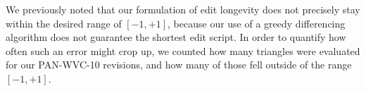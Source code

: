 We previously noted that our formulation of edit longevity does
not precisely stay within the desired range of $[-1,+1]$,
because our use of a greedy differencing algorithm does not
guarantee the shortest edit script.
In order to quantify how often such an error might crop up,
we counted how many triangles were evaluated for our PAN-WVC-10
revisions, and how many of those fell outside of the range $[-1,+1]$.



